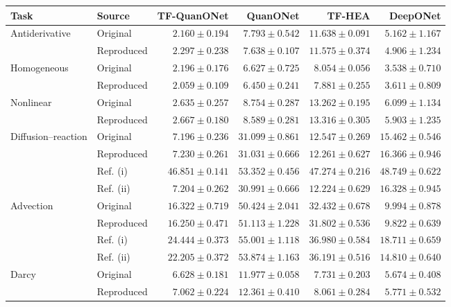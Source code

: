 \begingroup
\fontsize{8.5}{10.5}\selectfont
\setlength{\tabcolsep}{1.5pt}
\renewcommand{\arraystretch}{1.1}
\begin{tabular}{@{}llrrrr@{}}
\toprule
Task & Source & TF-QuanONet & QuanONet & TF-HEA & DeepONet\\
\midrule
Antiderivative & Original & $2.160 \pm 0.194$ & $7.793 \pm 0.542$ & $11.638 \pm 0.091$ & $5.162 \pm 1.167$\\
 & Reproduced & $2.297 \pm 0.238$ & $7.638 \pm 0.107$ & $11.575 \pm 0.374$ & $4.906 \pm 1.234$\\
\addlinespace[3pt]
Homogeneous & Original & $2.196 \pm 0.176$ & $6.627 \pm 0.725$ & $8.054 \pm 0.056$ & $3.538 \pm 0.710$\\
 & Reproduced & $2.059 \pm 0.109$ & $6.450 \pm 0.241$ & $7.881 \pm 0.255$ & $3.611 \pm 0.809$\\
\addlinespace[3pt]
Nonlinear & Original & $2.635 \pm 0.257$ & $8.754 \pm 0.287$ & $13.262 \pm 0.195$ & $6.099 \pm 1.134$\\
 & Reproduced & $2.667 \pm 0.180$ & $8.589 \pm 0.281$ & $13.316 \pm 0.305$ & $5.903 \pm 1.235$\\
\addlinespace[3pt]
Diffusion--reaction & Original & $7.196 \pm 0.236$ & $31.099 \pm 0.861$ & $12.547 \pm 0.269$ & $15.462 \pm 0.546$\\
 & Reproduced & $7.230 \pm 0.261$ & $31.031 \pm 0.666$ & $12.261 \pm 0.627$ & $16.366 \pm 0.946$\\
 & Ref. (i) & $46.851 \pm 0.141$ & $53.352 \pm 0.456$ & $47.274 \pm 0.216$ & $48.749 \pm 0.622$\\
 & Ref. (ii) & $7.204 \pm 0.262$ & $30.991 \pm 0.666$ & $12.224 \pm 0.629$ & $16.328 \pm 0.945$\\
\addlinespace[3pt]
Advection & Original & $16.322 \pm 0.719$ & $50.424 \pm 2.041$ & $32.432 \pm 0.678$ & $9.994 \pm 0.878$\\
 & Reproduced & $16.250 \pm 0.471$ & $51.113 \pm 1.228$ & $31.802 \pm 0.536$ & $9.822 \pm 0.639$\\
 & Ref. (i) & $24.444 \pm 0.373$ & $55.001 \pm 1.118$ & $36.980 \pm 0.584$ & $18.711 \pm 0.659$\\
 & Ref. (ii) & $22.205 \pm 0.372$ & $53.874 \pm 1.163$ & $36.191 \pm 0.516$ & $14.810 \pm 0.640$\\
\addlinespace[3pt]
Darcy & Original & $6.628 \pm 0.181$ & $11.977 \pm 0.058$ & $7.731 \pm 0.203$ & $5.674 \pm 0.408$\\
 & Reproduced & $7.062 \pm 0.224$ & $12.361 \pm 0.410$ & $8.061 \pm 0.284$ & $5.771 \pm 0.532$\\
\bottomrule
\end{tabular}
\endgroup
